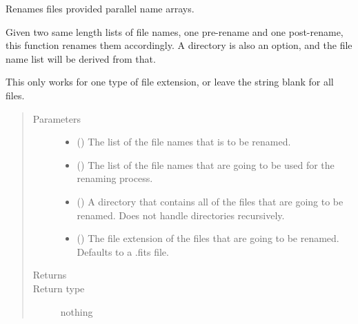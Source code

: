\documentclass[letterpaper,10pt,english]{sphinxmanual}
\begin{document}
\begin{fulllineitems}
\label{\detokenize{python_docstrings/IfA_Smeargle.bravo.bravo_functions:IfA_Smeargle.bravo.bravo_functions.bravo_rename_parallel}}
Renames files provided parallel name arrays.

Given two same length lists of file names, one pre-rename and one
post-rename, this function renames them accordingly. A directory is also
an option, and the file name list will be derived from that.

This only works for one type of file extension, or leave the string blank
for all files.
\begin{quote}\begin{description}
\item[{Parameters}] \leavevmode\begin{itemize}
\item {} 
 () \textendash{} The list of the file names that is to be renamed.

\item {} 
 () \textendash{} The list of the file names that are going to be used for the renaming
process.

\item {} 
 (\sphinxstyleliteralemphasis{\sphinxupquote{ (}}\sphinxstyleliteralemphasis{\sphinxupquote{)}}) \textendash{} A directory that contains all of the files that are going to be
renamed. Does not handle directories recursively.

\item {} 
 (\sphinxstyleliteralemphasis{\sphinxupquote{ (}}\sphinxstyleliteralemphasis{\sphinxupquote{)}}) \textendash{} The file extension of the files that are going to be renamed. Defaults
to a .fits file.

\end{itemize}

\item[{Returns}] \leavevmode


\item[{Return type}] \leavevmode
nothing

\end{description}\end{quote}

\end{fulllineitems}
\end{document}
